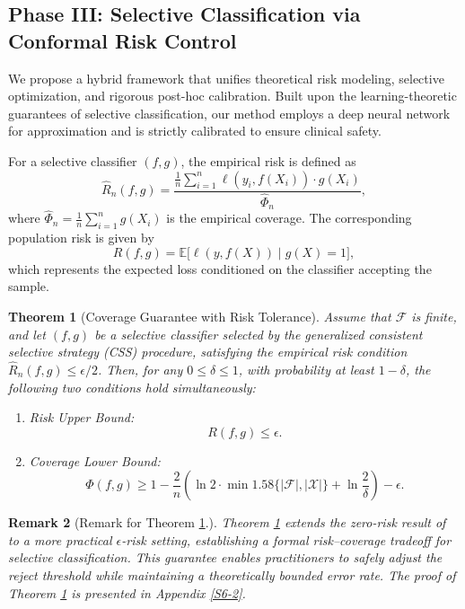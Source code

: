 \documentclass[journal,twoside,web]{ieeecolor}
\newtheorem{theorem}{Theorem}[section]
\newtheorem{remark}[theorem]{Remark}
\begin{document}
\subsection{Phase III: Selective Classification via Conformal Risk Control}\label{sec:phase3_method}

We propose a hybrid framework that unifies theoretical risk modeling, selective optimization, and rigorous post-hoc calibration. Built upon the learning-theoretic guarantees of selective classification, our method employs a deep neural network for approximation and is strictly calibrated to ensure clinical safety.

For a selective classifier $(f,g)$, the empirical risk is defined as
\[
\hat{R}_n(f,g) = \frac{\frac{1}{n} \sum_{i=1}^n \ell(y_i, f(X_i)) \cdot g(X_i)}
{\hat{\Phi}_n},
\]
where $\hat{\Phi}_n = \frac{1}{n} \sum_{i=1}^n g(X_i)$ is the empirical coverage.
The corresponding population risk is given by
\[
R(f,g) = \mathbb{E}\bigl[\ell(y, f(X)) \mid g(X) = 1\bigr],
\]
which represents the expected loss conditioned on the classifier accepting the sample.
\begin{theorem}[Coverage Guarantee with Risk Tolerance]\label{Th2}
Assume that $\mathcal{F}$ is finite, and let $(f,g)$ be a selective classifier selected by the generalized consistent selective strategy (CSS) procedure, satisfying the empirical risk condition $\hat{R}_n(f,g) \leq \epsilon/2$. Then, for any $0 \leq \delta \leq 1$, with probability at least $1-\delta$, the following two conditions hold simultaneously:
\begin{enumerate}
    \item Risk Upper Bound: 
    \[R(f,g) \leq \epsilon.
    \]
    \item Coverage Lower Bound:
    \[
    \Phi(f,g) \geq 1 - \frac{2}{n} \left( \ln 2 \cdot \min1.58\{|\mathcal{F}|, |\mathcal{X}|\} + \ln \frac{2}{\delta} \right) - \epsilon.
    \]
\end{enumerate}
\end{theorem}
\begin{remark}[Remark for Theorem \ref{Th2}.]
Theorem \ref{Th2} extends the zero-risk result of \cite{el2010foundations} to a more practical $\epsilon$-risk setting, establishing a formal risk–coverage tradeoff for selective classification. This guarantee enables practitioners to safely adjust the reject threshold while maintaining a theoretically bounded error rate. The proof of Theorem \ref{Th2} is presented in Appendix \ref{S6-2}.
\end{remark}
\end{document}
